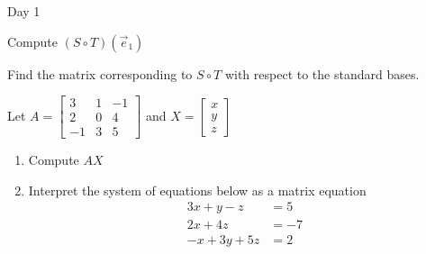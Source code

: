 \begin{applicationActivities}{Day 1}
\begin{activity}{0}
  Compute $(S \circ T)(\vec{e}_1)$
\end{activity}

\begin{activity}{0}
  Find the matrix corresponding to $S \circ T$ with respect to the standard bases.
\end{activity}

\begin{activity}{0}
Let $A=\begin{bmatrix} 3 & 1 & -1 \\ 2 & 0 & 4 \\ -1 & 3 & 5 \end{bmatrix}$ and $X=\begin{bmatrix} x \\ y \\ z \end{bmatrix}$
\begin{enumerate}
\item Compute $AX$
\item Interpret the system of equations below as a matrix equation
\begin{align*}
3x+y-z &= 5 \\ 2x+4z &= -7 \\ -x+3y+5z &=2
\end{align*}
\end{enumerate}
\end{activity}

\end{applicationActivities}
